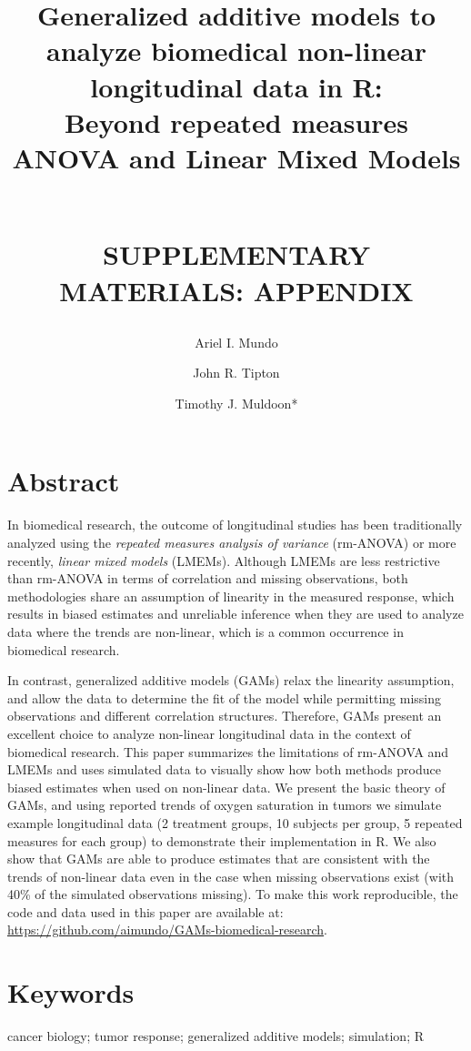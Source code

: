 \documentclass[
]{article}
\title{\textbf{Generalized additive models to analyze biomedical non-linear longitudinal data in R:}\\
Beyond repeated measures ANOVA and Linear Mixed Models\\
\strut \\
SUPPLEMENTARY MATERIALS: APPENDIX}
\date{\vspace{-2.5em}}
\author{Ariel I. Mundo \orcidaffila{}}
\affil{Department of Biomedical Engineering, University of Arkansas, Fayetteville, AR, USA}
\author{John R. Tipton \orcidaffilb{}}
\affil{Department of Mathematical Sciences, University of Arkansas, Fayetteville, AR, USA}
\author{Timothy J. Muldoon*}
\affil{Department of Biomedical Engineering, University of Arkansas, Fayetteville, AR, USA}
\affil{tmuldoon@uark.edu}
\begin{document}
\maketitle

\newpage

\hypertarget{abstract}{%
\section{Abstract}\label{abstract}}

In biomedical research, the outcome of longitudinal studies has been traditionally analyzed using the \emph{repeated measures analysis of variance} (rm-ANOVA) or more recently, \emph{linear mixed models} (LMEMs). Although LMEMs are less restrictive than rm-ANOVA in terms of correlation and missing observations, both methodologies share an assumption of linearity in the measured response, which results in biased estimates and unreliable inference when they are used to analyze data where the trends are non-linear, which is a common occurrence in biomedical research.

In contrast, generalized additive models (GAMs) relax the linearity assumption, and allow the data to determine the fit of the model while permitting missing observations and different correlation structures. Therefore, GAMs present an excellent choice to analyze non-linear longitudinal data in the context of biomedical research. This paper summarizes the limitations of rm-ANOVA and LMEMs and uses simulated data to visually show how both methods produce biased estimates when used on non-linear data. We present the basic theory of GAMs, and using reported trends of oxygen saturation in tumors we simulate example longitudinal data (2 treatment groups, 10 subjects per group, 5 repeated measures for each group) to demonstrate their implementation in R. We also show that GAMs are able to produce estimates that are consistent with the trends of non-linear data even in the case when missing observations exist (with 40\% of the simulated observations missing). To make this work reproducible, the code and data used in this paper are available at: \url{https://github.com/aimundo/GAMs-biomedical-research}.

\hypertarget{keywords}{%
\section*{Keywords}\label{keywords}}

cancer biology; tumor response; generalized additive models; simulation; R
\end{document}
